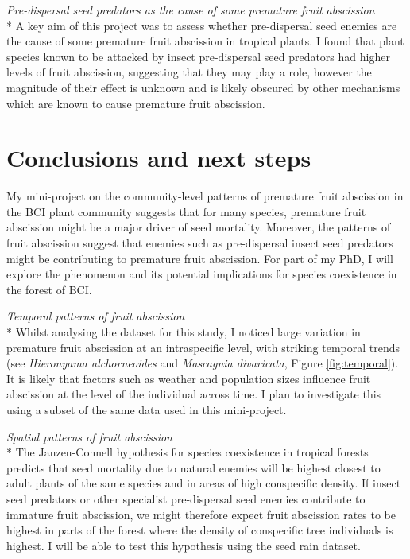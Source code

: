 \emph{Pre-dispersal seed predators as the cause of some premature fruit abscission}\\*
A key aim of this project was to assess whether pre-dispersal seed enemies are the cause of some premature fruit abscission in tropical plants. I found that plant species known to be attacked by insect pre-dispersal seed predators had higher levels of fruit abscission, suggesting that they may play a role, however the magnitude of their effect is unknown and is likely obscured by other mechanisms which are known to cause premature fruit abscission.

\section{Conclusions and next steps}
My mini-project on the community-level patterns of premature fruit abscission in the BCI plant community suggests that for many species, premature fruit abscission might be a major driver of seed mortality. Moreover, the patterns of fruit abscission suggest that enemies such as pre-dispersal insect seed predators might be contributing to premature fruit abscission. For part of my PhD, I will explore the phenomenon and its potential implications for species coexistence in the forest of BCI.

\emph{Temporal patterns of fruit abscission}\\*
Whilst analysing the dataset for this study, I noticed large variation in premature fruit abscission at an intraspecific level, with striking temporal trends (see \textit{Hieronyama alchorneoides} and \textit{Mascagnia divaricata}, Figure \ref{fig:temporal}). It is likely that factors such as weather and population sizes influence fruit abscission at the level of the individual across time. I plan to investigate this using a subset of the same data used in this mini-project.

\emph{Spatial patterns of fruit abscission}\\*
The Janzen-Connell hypothesis for species coexistence in tropical forests predicts that seed mortality due to natural enemies will be highest closest to adult plants of the same species and in areas of high conspecific density. If insect seed predators or other specialist pre-dispersal seed enemies contribute to immature fruit abscission, we might therefore expect fruit abscission rates to be highest in parts of the forest where the density of conspecific tree individuals is highest. I will be able to test this hypothesis using the seed rain dataset.


